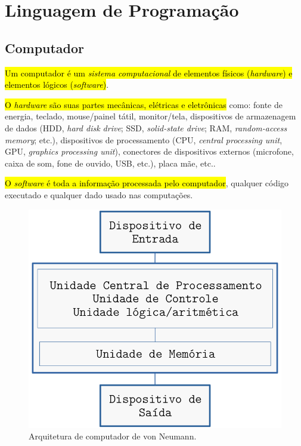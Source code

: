 \chapter{Linguagem de Programação}\label{cap_lingua}

\section{Computador}\label{cap_lim_sec_computador}

\hl{Um computador é um \emph{sistema computacional} de elementos físicos (\emph{hardware}) e elementos lógicos (\emph{software})}.

\hl{O \emph{hardware} são suas partes mecânicas, elétricas e eletrônicas} como: fonte de energia, teclado, mouse/painel tátil, monitor/tela, dispositivos de armazenagem de dados (HDD, \textit{hard disk drive}; SSD, \textit{solid-state drive}; RAM, \textit{random-access memory}; etc.), dispositivos de processamento (CPU, \textit{central processing unit}, GPU, \textit{graphics processing unit}), conectores de dispositivos externos (microfone, caixa de som, fone de ouvido, USB, etc.), placa mãe, etc..

\hl{O \emph{software} é toda a informação processada pelo computador}, qualquer código executado e qualquer dado usado nas computações.

\begin{figure}[H]
  \centering
  \includegraphics[width=4.75in]{./cap_lingua/dados/fig_arqVonNeumann/fig.png}
  \caption[Arquitetura de von Neumann]{Arquitetura de computador de von Neumann.}
  \label{cap_lim_sec_computador:fig:arqVonNeumann}
\end{figure}

